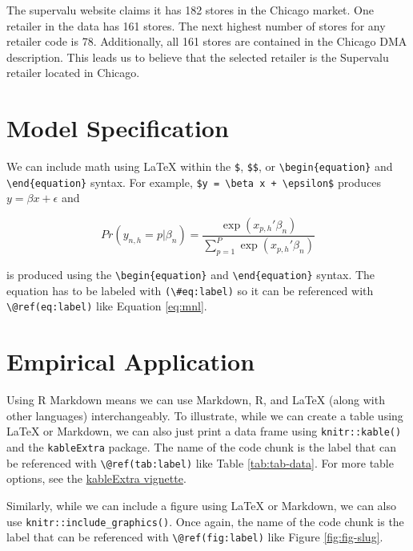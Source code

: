 \documentclass[12pt,titlepage]{mktg-article}
\begin{document}
The supervalu website claims it has 182 stores in the Chicago market. One retailer in the data has 161 stores. The next highest number of stores for any retailer code is 78. Additionally, all 161 stores are contained in the Chicago DMA description. This leads us to believe that the selected retailer is the Supervalu retailer located in Chicago.

\hypertarget{model-specification}{%
\section{Model Specification}\label{model-specification}}

We can include math using LaTeX within the \texttt{\$}, \texttt{\$\$}, or \texttt{\textbackslash{}begin\{equation\}} and \texttt{\textbackslash{}end\{equation\}} syntax. For example, \texttt{\$y\ =\ \textbackslash{}beta\ x\ +\ \textbackslash{}epsilon\$} produces \(y = \beta x + \epsilon\) and

\begin{equation}
Pr(y_{n,h}=p|\beta_n) = \frac{\exp{(x_{p,h}'\beta_n)}}{\sum_{p=1}^P\exp{(x_{p,h}'\beta_n)}}
\label{eq:mnl}
\end{equation}

\noindent is produced using the \texttt{\textbackslash{}begin\{equation\}} and \texttt{\textbackslash{}end\{equation\}} syntax. The equation has to be labeled with \texttt{(\textbackslash{}\#eq:label)} so it can be referenced with \texttt{\textbackslash{}@ref(eq:label)} like Equation \eqref{eq:mnl}.

\hypertarget{empirical-application}{%
\section{Empirical Application}\label{empirical-application}}

Using R Markdown means we can use Markdown, R, and LaTeX (along with other languages) interchangeably. To illustrate, while we can create a table using LaTeX or Markdown, we can also just print a data frame using \texttt{knitr::kable()} and the \texttt{kableExtra} package. The name of the code chunk is the label that can be referenced with \texttt{\textbackslash{}@ref(tab:label)} like Table \ref{tab:tab-data}. For more table options, see the \href{https://haozhu233.github.io/kableExtra/awesome_table_in_pdf.pdf}{kableExtra vignette}.

Similarly, while we can include a figure using LaTeX or Markdown, we can also use \texttt{knitr::include\_graphics()}. Once again, the name of the code chunk is the label that can be referenced with \texttt{\textbackslash{}@ref(fig:label)} like Figure \ref{fig:fig-slug}.
\end{document}
